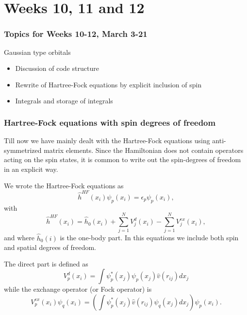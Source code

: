 \section[Weeks 10 and 11]{Weeks 10, 11 and 12}

\frame
{
  \frametitle{Topics for Weeks 10-12, March 3-21}
  \begin{block}{Gaussian type orbitals}
\begin{itemize}
\item Discussion of code structure
\item Rewrite of Hartree-Fock equations by explicit inclusion of spin
\item Integrals and storage of integrals
\end{itemize}
  \end{block}
} 

\frame
{
  \frametitle{Hartree-Fock equations with spin degrees of freedom}
\begin{small}
{\scriptsize
Till now we have mainly dealt with the Hartree-Fock equations using anti-symmetrized matrix elements. Since the Hamiltonian does not 
contain operators acting on the spin states, it is common to write out the spin-degrees of freedom in an explicit way.

We wrote the Hartree-Fock equations as
\[
  \hat{h}^{HF}(x_i) \psi_{p}(x_i) = \epsilon_{p}\psi_{p}(x_i),
\]
with
\[
  \hat{h}^{HF}(x_i)= \hat{h}_0(x_i) + \sum_{j=1}^NV_{j}^{d}(x_i) -
  \sum_{j=1}^NV_{j}^{ex}(x_i),
\]
and where $\hat{h}_0(i)$ is the one-body part.
In this equations we include both spin and spatial degrees of freedom.

The direct part is defined as 
\begin{equation*}
  V_{p}^{d}(x_i) = \int \psi_{p}^*(x_j)\psi_{p}(x_j)\hat{v}(r_{ij}) dx_j
\end{equation*}
while the exchange operator (or Fock operator) is
\begin{equation*}
  V_{p}^{ex}(x_i) \psi_{q}(x_i) 
  = \left(\int \psi_{p}^*(x_j) 
  \hat{v}(r_{ij})\psi_{q}(x_j)
  dx_j\right)\psi_{p}(x_i).
\end{equation*}

}
\end{small}
}
















